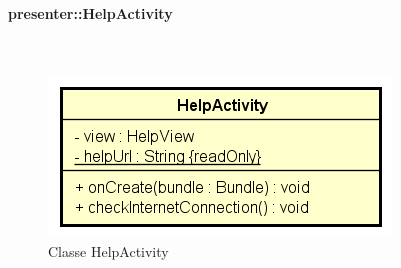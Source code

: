 \documentclass[../DefinizioneDiProdotto.tex]{subfiles}
\begin{document}
\paragraph{presenter::HelpActivity}
\
\begin{figure}[H]
	\centering
	\includegraphics[width=\maxwidth]{img/HelpActivity.png}
	\caption{Classe HelpActivity}\label{fig:presenter::HelpActivity} 
\end{figure}
\end{document}

